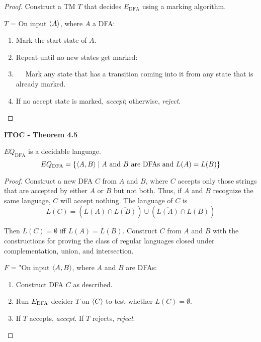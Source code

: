 \begin{mdframed}
\begin{proof}
Construct a TM $T$ that decides $E_\text{DFA}$ using a marking algorithm.

\medskip
$T$ = On input $\langle{A}\rangle$, where $A$ a DFA:
\begin{enumerate}
\item Mark the start state of $A$.
\item Repeat until no new states get marked:
\item $\quad$ Mark any state that has a transition coming into it from any state that is already marked.
\item If no accept state is marked, \textit{accept}; otherwise, \textit{reject}.
\end{enumerate}
\end{proof}
\end{mdframed}

\label{lang:EQDFA_DCDB}
\begin{shaded}
\textbf{ITOC - Theorem 4.5}

\medskip
$EQ_\text{DFA}$ is a decidable language.
\[
EQ_\text{DFA} = \{\langle{A, B}\rangle \mid A \text{ and } B \text{ are DFAs and } L(A) = L(B) \}
\]
\end{shaded}

\begin{mdframed}
\begin{proof}
Construct a new DFA $C$ from $A$ and $B$, where $C$ accepts only those strings that are accepted by either $A$ or $B$ but not both. Thus, if $A$ and $B$ recognize the same language, $C$ will accept nothing. The language of $C$ is 
\[
L(C) = \left( L(A) \cap \overline{L(B)} \right)\cup \left( \overline{L(A)} \cap L(B) \right)
\]

Then $L(C) = \emptyset$ iff $L(A) = L(B)$. Construct $C$ from $A$ and $B$ with the constructions for proving the class of regular languages closed under complementation, union, and intersection.

\medskip
$F$ = "On input $\langle{A,B}\rangle$, where $A$ and $B$ are DFAs:
\begin{enumerate}
\item Construct DFA $C$ as described.
\item Run $E_{\text{DFA}}$ decider $T$ on $\langle{C}\rangle$ to test whether $L(C) = \emptyset$.
\item If $T$ accepts, \textit{accept}. If $T$ rejects, \textit{reject}.
\end{enumerate}
\end{proof}
\end{mdframed}

